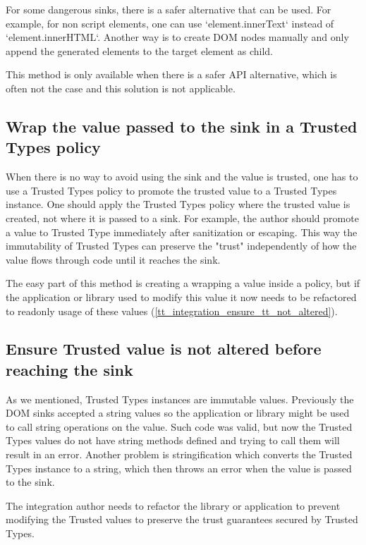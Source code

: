 For some dangerous sinks, there is a safer alternative that can be used. For example, for non script
elements, one can use `element.innerText` instead of `element.innerHTML`. Another way is to create
DOM nodes manually and only append the generated elements to the target element as child.

This method is only available when there is a safer API alternative, which is often not the case and
this solution is not applicable.

\subsection{Wrap the value passed to the sink in a Trusted Types policy}

When there is no way to avoid using the sink and the value is trusted, one has to use a Trusted
Types policy to promote the trusted value to a Trusted Types instance. One should apply the Trusted
Types policy where the trusted value is created, not where it is passed to a sink. For example, the
author should promote a value to Trusted Type immediately after sanitization or escaping. This way
the immutability of Trusted Types can preserve the "trust" independently of how the value flows
through code until it reaches the sink.

The easy part of this method is creating a wrapping a value inside a policy, but if the application
or library used to modify this value it now needs to be refactored to readonly usage of these values
(\ref{tt_integration_ensure_tt_not_altered}).

\label{tt_integration_ensure_tt_not_altered}
\subsection{Ensure Trusted value is not altered before reaching the sink}

As we mentioned, Trusted Types instances are immutable values. Previously the DOM sinks accepted a
string values so the application or library might be used to call string operations on the value.
Such code was valid, but now the Trusted Types values do not have string methods defined and trying
to call them will result in an error. Another problem is stringification which converts the Trusted
Types instance to a string, which then throws an error when the value is passed to the sink.

The integration author needs to refactor the library or application to prevent modifying the
Trusted values to preserve the trust guarantees secured by Trusted Types.


